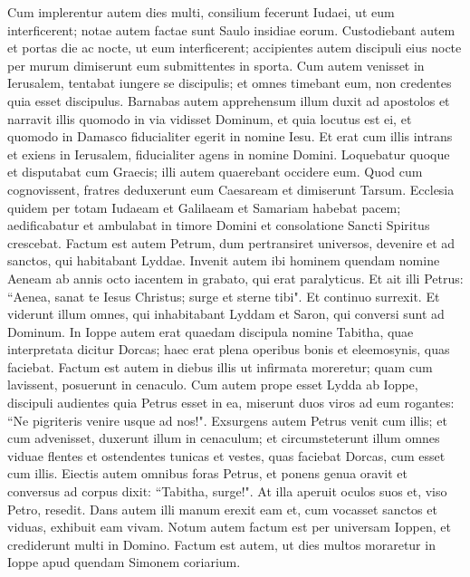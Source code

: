 \begin{biblechapter}
\verse Cum implerentur autem dies multi, consilium fecerunt Iudaei, ut eum interficerent; 
\verse notae autem factae sunt Saulo insidiae eorum. Custodiebant autem et portas die ac nocte, ut eum interficerent; 
\verse accipientes autem discipuli eius nocte per murum dimiserunt eum submittentes in sporta. 
\verse Cum autem venisset in Ierusalem, tentabat iungere se discipulis; et omnes timebant eum, non credentes quia esset discipulus. 
\verse Barnabas autem apprehensum illum duxit ad apostolos et narravit illis quomodo in via vidisset Dominum, et quia locutus est ei, et quomodo in Damasco fiducialiter egerit in nomine Iesu. 
\verse Et erat cum illis intrans et exiens in Ierusalem, fiducialiter agens in nomine Domini. 
\verse Loquebatur quoque et disputabat cum Graecis; illi autem quaerebant occidere eum. 
\verse Quod cum cognovissent, fratres deduxerunt eum Caesaream et dimiserunt Tarsum. 
\verse Ecclesia quidem per totam Iudaeam et Galilaeam et Samariam habebat pacem; aedificabatur et ambulabat in timore Domini et consolatione Sancti Spiritus crescebat. 
\verse Factum est autem Petrum, dum pertransiret universos, devenire et ad sanctos, qui habitabant Lyddae. 
\verse Invenit autem ibi hominem quendam nomine Aeneam ab annis octo iacentem in grabato, qui erat paralyticus. 
\verse Et ait illi Petrus: “Aenea, sanat te Iesus Christus; surge et sterne tibi". Et continuo surrexit. 
\verse Et viderunt illum omnes, qui inhabitabant Lyddam et Saron, qui conversi sunt ad Dominum. 
\verse In Ioppe autem erat quaedam discipula nomine Tabitha, quae interpretata dicitur Dorcas; haec erat plena operibus bonis et eleemosynis, quas faciebat.  
\verse Factum est autem in diebus illis ut infirmata moreretur; quam cum lavissent, posuerunt in cenaculo. 
\verse Cum autem prope esset Lydda ab Ioppe, discipuli audientes quia Petrus esset in ea, miserunt duos viros ad eum rogantes: “Ne pigriteris venire usque ad nos!". 
\verse Exsurgens autem Petrus venit cum illis; et cum advenisset, duxerunt illum in cenaculum; et circumsteterunt illum omnes viduae flentes et ostendentes tunicas et vestes, quas faciebat Dorcas, cum esset cum illis. 
\verse Eiectis autem omnibus foras Petrus, et ponens genua oravit et conversus ad corpus dixit: “Tabitha, surge!". At illa aperuit oculos suos et, viso Petro, resedit. 
\verse Dans autem illi manum erexit eam et, cum vocasset sanctos et viduas, exhibuit eam vivam. 
\verse Notum autem factum est per universam Ioppen, et crediderunt multi in Domino. 
\verse Factum est autem, ut dies multos moraretur in Ioppe apud quendam Simonem coriarium. 
\end{biblechapter}

